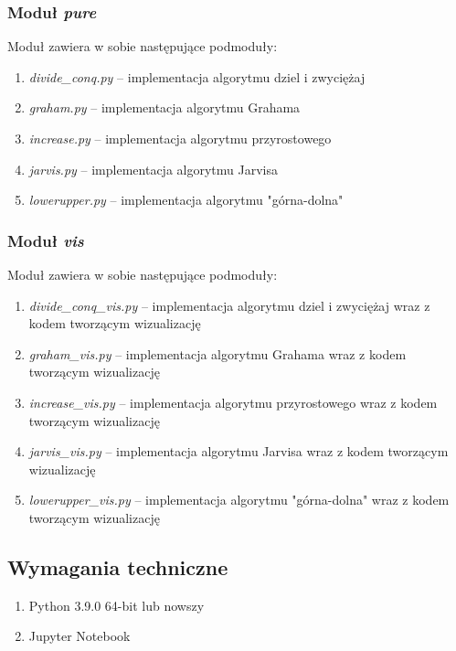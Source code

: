 \documentclass[11pt]{article}
\theoremstyle{remark} \newtheorem{definition}{def.}
\theoremstyle{definition} \newtheorem{twierdzenie}{tw.}
\begin{document}
\subsubsection{Moduł \emph{pure}}

Moduł zawiera w sobie następujące podmoduły:

\begin{enumerate}
    \item   \emph{divide\_conq.py} -- implementacja algorytmu dziel i zwyciężaj
    \item   \emph{graham.py} -- implementacja algorytmu Grahama
    \item   \emph{increase.py} -- implementacja algorytmu przyrostowego
    \item   \emph{jarvis.py} -- implementacja algorytmu Jarvisa
    \item   \emph{lowerupper.py} -- implementacja algorytmu "górna-dolna"
\end{enumerate}

\subsubsection{Moduł \emph{vis}}

Moduł zawiera w sobie następujące podmoduły:

\begin{enumerate}
    \item   \emph{divide\_conq\_vis.py} -- implementacja algorytmu dziel i zwyciężaj wraz z kodem tworzącym wizualizację
    \item   \emph{graham\_vis.py} -- implementacja algorytmu Grahama wraz z kodem tworzącym wizualizację
    \item   \emph{increase\_vis.py} -- implementacja algorytmu przyrostowego wraz z kodem tworzącym wizualizację
    \item   \emph{jarvis\_vis.py} -- implementacja algorytmu Jarvisa wraz z kodem tworzącym wizualizację
    \item   \emph{lowerupper\_vis.py} -- implementacja algorytmu "górna-dolna" wraz z kodem tworzącym wizualizację
\end{enumerate}


\subsection{Wymagania techniczne}

\begin{enumerate}
    \item   Python 3.9.0 64-bit lub nowszy
    \item   Jupyter Notebook
\end{enumerate}
\end{document}
